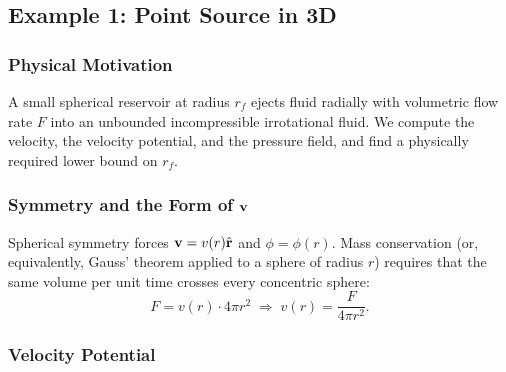 \documentclass[../main.tex]{subfiles}
\begin{document}

\subsection{Example 1: Point Source in 3D}\label{sec:lec15:point_source}

\subsubsection*{Physical Motivation}
A small spherical reservoir at radius $r_f$ ejects fluid radially with volumetric flow rate $F$ into an unbounded incompressible irrotational fluid. We compute the velocity, the velocity potential, and the pressure field, and find a physically required lower bound on $r_f$.

\begin{center}
\end{center}

\subsubsection{Symmetry and the Form of $\mathbf{v}$}

Spherical symmetry forces $\mathbf{v} = v(r)\hat{\mathbf{r}}$ and $\phi=\phi(r)$. Mass conservation (or, equivalently, Gauss' theorem applied to a sphere of radius $r$) requires that the same volume per unit time crosses every concentric sphere:
\begin{equation}
  F = v(r)\cdot 4\pi r^2 \;\Longrightarrow\; v(r) = \frac{F}{4\pi r^2}.
  \label{eq:lec15_v_source}
\end{equation}

\subsubsection{Velocity Potential}
\end{document}
